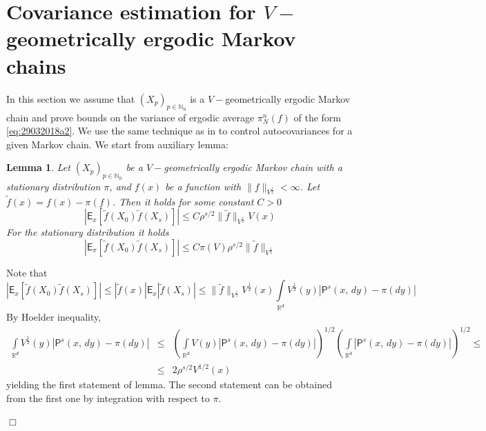 \documentclass[bj]{imsart}
\def\nset{\mathbb{N}}
\def\rset{\mathbb{R}}
\def\rset{\mathbb{R}}
\newcommand{\proofendsign}{$\Box$}
\newtheorem{lem}[thm]{Lemma}
\newenvironment{proof}{{\noindent \bf Proof }}
 {{\hspace*{\fill}\proofendsign\par\bigskip}}
\begin{document}
\section{Covariance estimation for $V-$geometrically ergodic Markov chains}\label{sec:appendix_moments}
In this section we assume that $(X_p)_{p \in \nset_0}$ is a $V-$geometrically ergodic Markov chain and prove bounds on the variance of ergodic average $\pi_N^n(f)$ of the form \eqref{eq:29032018a2}. We use the same technique as in \cite{belomestny2019esvm} to control autocovariances for a given Markov chain. We start from auxiliary lemma:
\begin{lem}
\label{lem:fp_covariance}
Let $(X_p)_{p \in \nset_0}$ be a $V-$geometrically ergodic Markov chain with a stationary distribution $\pi$, and $f(x)$ be a function with $\|f\|_{V^{\frac{1}{2}}} < \infty$. Let $\tilde{f}(x) = f(x) - \pi(f)$. Then it holds for some constant $C > 0$
\begin{equation}
|\mathsf{E}_x[\tilde{f}(X_0)\tilde{f}(X_s)]| \leq C\rho^{s/2}\|\tilde{f}\|_{V^{\frac{1}{2}}}V(x)
\end{equation}
For the stationary distribution it holds
\begin{equation}
|\mathsf{E}_{\pi}[\tilde{f}(X_0)\tilde{f}(X_s)]| \leq C\pi(V)\rho^{s/2}\|\tilde{f}\|_{V^{\frac{1}{2}}}
\end{equation}
\end{lem}
\begin{proof}
Note that
\[
|\mathsf{E}_x[\tilde{f}(X_0)\tilde{f}(X_s)]| \leq |\tilde{f}(x)| \mathsf{E}_x|\tilde{f}(X_s)| \leq \|\tilde{f}\|_{V^{\frac{1}{2}}}V^{\frac{1}{2}}(x)\int\limits_{\rset^d} V^{\frac{1}{2}}(y)|\mathsf{P}^{s}(x,\,dy)-\pi(dy)|
\]
By Hoelder inequality,
\begin{eqnarray*}
\int\limits_{\rset^d} V^{\frac{1}{2}}(y)|\mathsf{P}^{s}(x,\,dy)-\pi(dy)| & \leq & \left(\int\limits_{\rset^d} V(y)|\mathsf{P}^{s}(x,\,dy)-\pi(dy)|\right)^{1/2}\left(\int\limits_{\rset^d}|\mathsf{P}^{s}(x,\,dy)-\pi(dy)|\right)^{1/2} \leq \\
& \leq & 2\rho^{s/2}V^{1/2}(x)
\end{eqnarray*}
yielding the first statement of lemma. The second statement can be obtained from the first one by integration with respect to $\pi$.
\end{proof}
\end{document}
